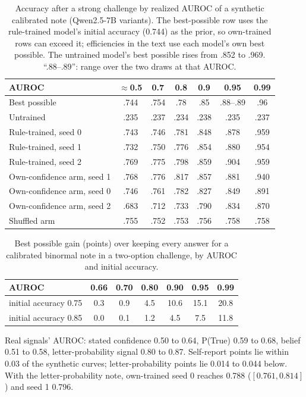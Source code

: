 \documentclass{article} %
\begin{document}
\begin{table}[h]
\caption{Accuracy after a strong challenge by realized AUROC of a synthetic calibrated note (Qwen2.5-7B variants). The best-possible row uses the rule-trained model's initial accuracy (0.744) as the prior, so own-trained rows can exceed it; efficiencies in the text use each model's own best possible. The untrained model's best possible rises from .852 to .969. ``.88--.89'': range over the two draws at that AUROC.}
\label{tab:curve}
\centering\footnotesize
\begin{tabular}{lcccccc}
\toprule
AUROC & $\approx$0.5 & 0.7 & 0.8 & 0.9 & 0.95 & 0.99 \\
\midrule
Best possible & .744 & .754 & .78 & .85 & .88--.89 & .96 \\
Untrained & .235 & .237 & .234 & .238 & .235 & .237 \\
Rule-trained, seed 0 & .743 & .746 & .781 & .848 & .878 & .959 \\
Rule-trained, seed 1 & .732 & .750 & .776 & .854 & .880 & .954 \\
Rule-trained, seed 2 & .769 & .775 & .798 & .859 & .904 & .959 \\
Own-confidence arm, seed 1 & .768 & .776 & .817 & .857 & .881 & .940 \\
Own-confidence arm, seed 0 & .746 & .761 & .782 & .827 & .849 & .891 \\
Own-confidence arm, seed 2 & .683 & .712 & .733 & .790 & .834 & .870 \\
Shuffled arm & .755 & .752 & .753 & .756 & .758 & .758 \\
\bottomrule
\end{tabular}
\end{table}

\begin{table}[h]
\caption{Best possible gain (points) over keeping every answer for a calibrated binormal note in a two-option challenge, by AUROC and initial accuracy.}
\label{tab:ceiling}
\centering\footnotesize
\begin{tabular}{lcccccc}
\toprule
AUROC & 0.66 & 0.70 & 0.80 & 0.90 & 0.95 & 0.99 \\
\midrule
initial accuracy 0.75 & 0.3 & 0.9 & 4.5 & 10.6 & 15.1 & 20.8 \\
initial accuracy 0.85 & 0.0 & 0.1 & 1.2 & 4.5 & 7.5 & 11.8 \\
\bottomrule
\end{tabular}
\end{table}

Real signals' AUROC: stated confidence 0.50 to 0.64, P(True) 0.59 to 0.68, belief 0.51 to 0.58, letter-probability signal 0.80 to 0.87. Self-report points lie within 0.03 of the synthetic curves; letter-probability points lie 0.014 to 0.044 below. With the letter-probability note, own-trained seed 0 reaches 0.788 ($[0.761, 0.814]$) and seed 1 0.796.
\end{document}
